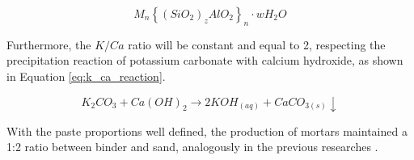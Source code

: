 \begin{equation}
    \label{eq:al_k_ratio}
    M_n \left\{ \left(SiO_2 \right)_z AlO_2 \right\}_n \cdot wH_2O
\end{equation}

Furthermore, the $K/Ca$ ratio will be constant and equal to 2, respecting the precipitation reaction of potassium carbonate with calcium hydroxide, as shown in Equation \ref{eq:k_ca_reaction}.

\begin{equation}
    \label{eq:k_ca_reaction}
    K_2CO_3 + Ca(OH)_2 \rightarrow  2KOH_{(aq)} + CaCO_{3(s)} \downarrow
\end{equation}

With the paste proportions well defined, the production of mortars maintained a 1:2 ratio between binder and sand, analogously in the previous researches \cite{batista2025mgosio2}. 



